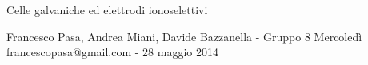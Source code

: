 \documentclass[11pt, twoside, a4paper]{article}
\begin{document}
\begin{center}

        {\huge Celle galvaniche ed elettrodi ionoselettivi}
    \vspace{0.1cm}

      	{Francesco Pasa, Andrea Miani, Davide Bazzanella - Gruppo 8 Mercoledì} \\
      	{francescopasa@gmail.com - 28 maggio 2014}
    \vspace{-0.2cm}

\end{center}





\end{document}
